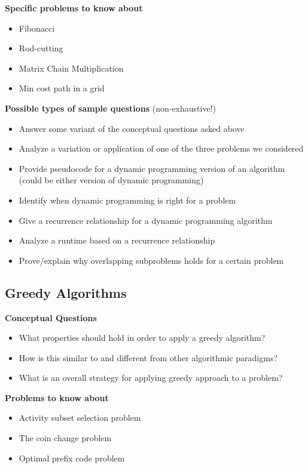 \documentclass[11  pt]{exam}
\begin{document}
	\textbf{Specific problems to know about}
	\begin{itemize}
		\item Fibonacci
		\item Rod-cutting
		\item Matrix Chain Multiplication
		\item Min cost path in a grid
	\end{itemize}
	
	\textbf{Possible types of sample questions} (non-exhaustive!)
	\begin{itemize}
				\item Answer some variant of the conceptual questions asked above
				\item Analyze a variation or application of one of the three problems we considered
		\item Provide pseudocode for a dynamic programming version of an algorithm (could be either version of dynamic programming)
		\item Identify when dynamic programming is right for a problem
		\item Give a recurrence relationship for a dynamic programming algorithm
		\item Analyze a runtime based on a recurrence relationship
		\item Prove/explain why overlapping subproblems holds for a certain problem
	\end{itemize}
	
	\subsection{Greedy Algorithms}
	\textbf{Conceptual Questions}
	\begin{itemize}
		\item What properties should hold in order to apply a greedy algorithm?
		\item How is this similar to and different from other algorithmic paradigms?
		\item What is an overall strategy for applying greedy approach to a problem?
	\end{itemize}
	
	\textbf{Problems to know about}
	\begin{itemize}
		\item Activity subset selection problem
		\item The coin change problem
		\item Optimal prefix code problem
	\end{itemize}
	
\end{document}
